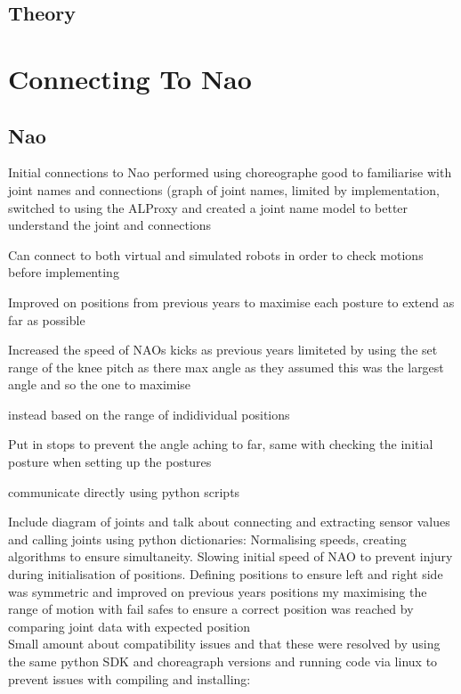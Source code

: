 \documentclass[11pt]{article}
\begin{document}
\subsection{Theory}

\section{Connecting To Nao}

\subsection{Nao}
Initial connections to Nao performed using choreographe good to familiarise with joint names and connections (graph of joint names, limited by implementation, switched to using the ALProxy and created a joint name model to better understand the joint and connections

Can connect to both virtual and simulated robots in order to check motions before implementing 

Improved on positions from previous years to maximise each posture to extend as far as possible 

Increased the speed of NAOs kicks as previous years limiteted by using the set range of the knee pitch as there max angle as they  assumed this was the largest angle and so the one to maximise

instead based on the range of indidividual positions 

Put in stops to prevent the angle aching to far, same with checking the initial posture when setting up the postures

communicate directly using python scripts


Include diagram of joints and talk about connecting and extracting sensor values and calling joints using python dictionaries:
Normalising speeds, creating algorithms to ensure simultaneity.
Slowing initial speed of NAO to prevent injury during initialisation of positions.
Defining positions to ensure left and right side was symmetric and improved on previous years positions my maximising the range of motion with fail safes to ensure a correct position was reached by comparing joint data with expected position\\

Small amount about compatibility issues and that these were resolved by using the same python SDK and choreagraph versions and running code via linux to prevent issues with compiling and installing: 
\end{document}

